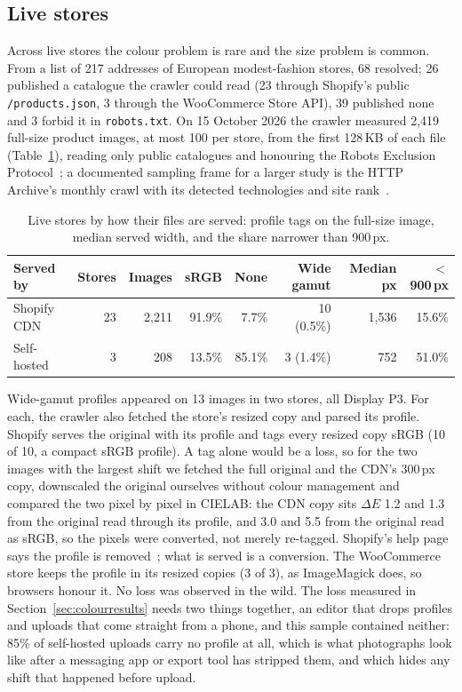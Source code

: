 \documentclass[sigconf,nonacm,screen]{acmart}
\begin{document}
\subsection{Live stores}
\label{sec:crawl}

Across live stores the colour problem is rare and the size problem is common. From a list of 217 addresses of European modest-fashion stores, 68 resolved; 26 published a catalogue the crawler could read (23 through Shopify's public \texttt{/products.json}, 3 through the WooCommerce Store API), 39 published none and 3 forbid it in \texttt{robots.txt}. On 15 October 2026 the crawler measured 2,419 full-size product images, at most 100 per store, from the first 128\,KB of each file (Table~\ref{tab:crawl}), reading only public catalogues and honouring the Robots Exclusion Protocol~\cite{rfc9309}; a documented sampling frame for a larger study is the HTTP Archive's monthly crawl with its detected technologies and site rank~\cite{httparchive}.

\begin{table}[t]
\caption{Live stores by how their files are served: profile tags on the full-size image, median served width, and the share narrower than 900\,px.}
\label{tab:crawl}
\footnotesize
\setlength{\tabcolsep}{4pt}
\begin{tabular}{@{}lrrrrrrr@{}}
\toprule
Served by & Stores & Images & sRGB & None & Wide gamut & Median px & $<$900\,px \\
\midrule
Shopify CDN & 23 & 2,211 & 91.9\% & 7.7\% & 10 (0.5\%) & 1,536 & 15.6\% \\
Self-hosted & 3 & 208 & 13.5\% & 85.1\% & 3 (1.4\%) & 752 & 51.0\% \\
\bottomrule
\end{tabular}
\end{table}

Wide-gamut profiles appeared on 13 images in two stores, all Display P3. For each, the crawler also fetched the store's resized copy and parsed its profile. Shopify serves the original with its profile and tags every resized copy sRGB (10 of 10, a compact sRGB profile). A tag alone would be a loss, so for the two images with the largest shift we fetched the full original and the CDN's 300\,px copy, downscaled the original ourselves without colour management and compared the two pixel by pixel in CIELAB: the CDN copy sits $\Delta E$ 1.2 and 1.3 from the original read through its profile, and 3.0 and 5.5 from the original read as sRGB, so the pixels were converted, not merely re-tagged. Shopify's help page says the profile is removed~\cite{shopifycolors}; what is served is a conversion. The WooCommerce store keeps the profile in its resized copies (3 of 3), as ImageMagick does, so browsers honour it. No loss was observed in the wild. The loss measured in Section~\ref{sec:colourresults} needs two things together, an editor that drops profiles and uploads that come straight from a phone, and this sample contained neither: 85\% of self-hosted uploads carry no profile at all, which is what photographs look like after a messaging app or export tool has stripped them, and which hides any shift that happened before upload.
\end{document}
